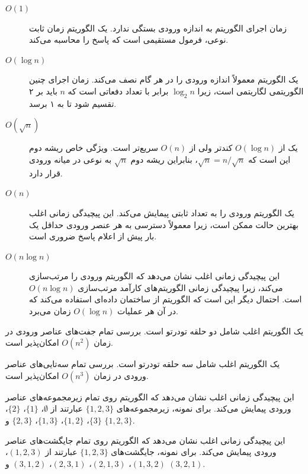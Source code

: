 \begin{description}
\item[$O(1)$]
زمان اجرای الگوریتم  به اندازه ورودی بستگی ندارد.
یک الگوریتم زمان ثابت نوعی، فرمول مستقیمی است که پاسخ را محاسبه می‌کند.

\item[$O(\log n)$]
یک الگوریتم  معمولاً اندازه ورودی را در هر گام نصف می‌کند.
زمان اجرای چنین الگوریتمی لگاریتمی است، زیرا $\log_2 n$ برابر با تعداد دفعاتی است که $n$ باید بر ۲ تقسیم شود تا به ۱ برسد.

\item[$O(\sqrt n)$]
یک  از $O(\log n)$ کندتر ولی از $O(n)$ سریع‌تر است.
ویژگی خاص ریشه دوم این است که $\sqrt n = n/\sqrt n$، بنابراین ریشه دوم $\sqrt n$ به نوعی در میانه ورودی قرار دارد.

\item[$O(n)$]
یک الگوریتم  ورودی را به تعداد ثابتی پیمایش می‌کند.
این پیچیدگی زمانی اغلب بهترین حالت ممکن است، زیرا معمولاً دسترسی به هر عنصر ورودی حداقل یک بار پیش از اعلام پاسخ ضروری است.

\item[$O(n \log n)$]
این پیچیدگی زمانی اغلب نشان می‌دهد که الگوریتم ورودی را مرتب‌سازی می‌کند، زیرا پیچیدگی زمانی الگوریتم‌های کارآمد مرتب‌سازی $O(n \log n)$ است.
احتمال دیگر این است که الگوریتم از ساختمان داده‌ای استفاده می‌کند که در آن هر عملیات $O(\log n)$ زمان می‌برد.
\end{description}

\item[$O(n^2)$]
یک الگوریتم  اغلب شامل
دو حلقه تو‌در‌تو است.
بررسی تمام جفت‌های عناصر ورودی
در زمان $O(n^2)$ امکان‌پذیر است.

\item[$O(n^3)$]
یک الگوریتم  اغلب شامل
سه حلقه تو‌در‌تو است.
بررسی تمام سه‌تایی‌های عناصر ورودی
در زمان $O(n^3)$ امکان‌پذیر است.

\item[$O(2^n)$]
این پیچیدگی زمانی اغلب نشان می‌دهد که
الگوریتم روی تمام زیرمجموعه‌های عناصر ورودی پیمایش می‌کند.
برای نمونه، زیرمجموعه‌های $\{1,2,3\}$ عبارتند از
$\emptyset$، $\{1\}$، $\{2\}$، $\{3\}$، $\{1,2\}$،
$\{1,3\}$، $\{2,3\}$ و $\{1,2,3\}$.

\item[$O(n!)$]
این پیچیدگی زمانی اغلب نشان می‌دهد که
الگوریتم روی تمام جایگشت‌های عناصر ورودی پیمایش می‌کند.
برای نمونه، جایگشت‌های $\{1,2,3\}$ عبارتند از
$(1,2,3)$، $(1,3,2)$، $(2,1,3)$، $(2,3,1)$،
$(3,1,2)$ و $(3,2,1)$.

